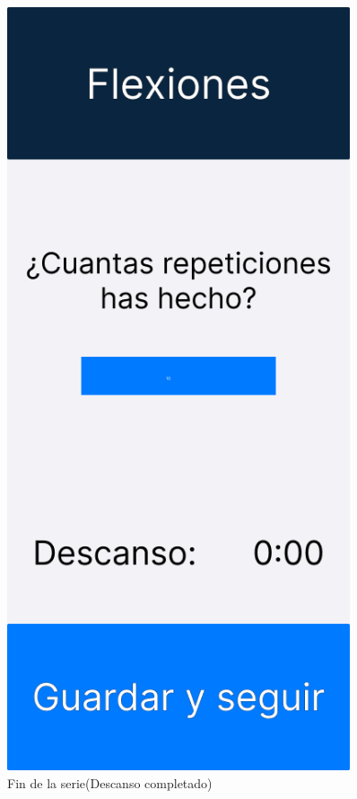 \begin{figure}[H]
   \centering
   \begin{minipage}{0.45\textwidth}
      \centering
      \includegraphics[width=0.9\textwidth]{fotos/Frame 5.png}
      \caption{Fin de la serie(Descanso completado)}

\end{minipage}
\end{figure}
